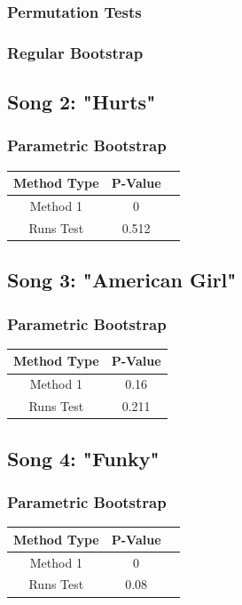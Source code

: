 \documentclass[12pt, letterpaper]{article}
\begin{document}
\subsubsection{Permutation Tests}
\subsubsection{Regular Bootstrap}

\subsection{Song 2: "Hurts"}

\subsubsection{Parametric Bootstrap}
\begin{tabular}{|c|c|c|}
\hline
\textbf{Method Type} & P-Value \\
\hline
Method 1 & 0  \\
\hline
Runs Test & 0.512 \\ 
\hline
\end{tabular}

\subsection{Song 3: "American Girl"}
\subsubsection{Parametric Bootstrap}

\begin{tabular}{|c|c|}
\hline
\textbf{Method Type} & P-Value \\
\hline
Method 1 & 0.16 \\
\hline
Runs Test & 0.211 \\ 
\hline 
\end{tabular}

\subsection{Song 4: "Funky"}
\subsubsection{Parametric Bootstrap}

\begin{tabular}{|c|c|c|}
\hline
\textbf{Method Type} & P-Value \\
\hline
Method 1 & 0 \\
\hline
Runs Test & 0.08  \\ 
\hline
\end{tabular}
\end{document}
